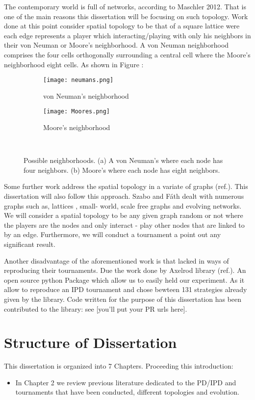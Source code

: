 The contemporary world is full of networks, according to Maschler 2012. That is
one of the main reasons this dissertation will be focusing on such
topology. Work done at this point consider spatial topology to be that of a square
lattice were each edge represents a player which interacting/playing with only
his neighbors in their von Neuman or Moore's neighborhood. A von Neuman neighborhood
comprises the four cells orthogonally surrounding a central cell where the
Moore's neighborhood eight cells. As shown in Figure :
\begin{figure}[h]
\centering
    \begin{subfigure}[t]{0.40\textwidth}
    \centering
        \texttt{[image: neumans.png]}
    \caption{von Neuman's neighborhood}
    \end{subfigure}
\hfill
    \begin{subfigure}[t]{0.40\textwidth}\centering
    \centering
        \texttt{[image: Moores.png]}
    \caption{Moore's neighborhood}
    \end{subfigure}
~
\caption{Possible neighborhoods. (a) A von Neuman's where each node has four neighbors.
(b) Moore's where each node has eight neighbors.}
\label{fig:neighborhood}
\end{figure}

Some further work address the spatial topology in a variate of graphs (ref.).
This dissertation will also follow this approach. Szabo and Fáth dealt with
numerous graphs such as, lattices , small- world, scale free graphs and evolving
networks. We will consider a spatial topology to be any given graph random or
not where the players are the nodes and only interact - play other nodes that are
linked to by an edge. Furthermore, we will conduct a tournament a point out
any significant result.

Another disadvantage of the aforementioned work is that lacked in ways of
reproducing their tournaments.  Due the work done by Axelrod library  (ref.). An
open source python Package which allow us to easily held our experiment.
As it allow to reproduce an IPD tournament and chose bewteen 131 strategies
already given by the library.  Code written for the purpose of this dissertation
has been contributed to the library: see [you'll put your PR urls here].

\section{Structure of Dissertation}
This dissertation is organized into 7 Chapters. Proceeding this introduction:
\begin{itemize}
  \item In Chapter 2 we review previous literature dedicated to the PD/IPD
        and tournaments that have been conducted, different topologies and evolution.
\end{itemize}
